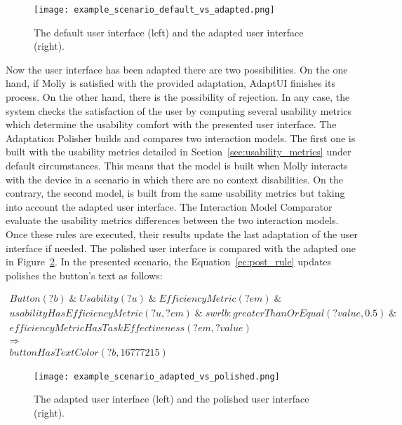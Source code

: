 \begin{figure}
\centering
\texttt{[image: example\_scenario\_default\_vs\_adapted.png]}
\caption{The default user interface (left) and the adapted user interface (right).}
\label{fig:example_scenario_default_vs_adapted}
\end{figure}


Now the user interface has been adapted there are two possibilities. On the one
hand, if Molly is satisfied with the provided adaptation, AdaptUI finishes its
process. On the other hand, there is the possibility of rejection. In any case,
the system checks the satisfaction of the user by computing several usability
metrics which determine the usability comfort with the presented user interface.
The Adaptation Polisher builds and compares two interaction models. The first 
one is built with the usability metrics detailed in 
Section~\ref{sec:usability_metrics} under default circumstances. This means that 
the model is built when Molly interacts with the device in a scenario in which
there are no context disabilities. On the contrary, the second model, is built 
from the same usability metrics but taking into account the adapted user interface. 
The Interaction Model Comparator evaluate the usability metrics differences
between the two interaction models. Once these rules are executed, their results 
update the last adaptation of the user interface if needed. The polished user 
interface is compared with the adapted one in 
Figure~\ref{fig:example_scenario_adapted_vs_polished}. In the presented scenario, 
the Equation~\ref{ec:post_rule} updates polishes the button's text as follows: 

\footnotesize
\begin{equation} \label{ec:post_rule} 
\begin{align*} 
Button(?b) \; \&\; Usability (?u) \; \&\; EfficiencyMetric(?em) \; \&\; \\
usabilityHasEfficiencyMetric(?u, ?em) \; \&\; swrlb:greaterThanOrEqual(?value, 0.5) \; \&\; \\
efficiencyMetricHasTaskEffectiveness(?em, ?value)\\
\Rightarrow \\
buttonHasTextColor(?b, 16777215)
\end{align*}
\end{equation}
\normalsize

\begin{figure}
\centering
\texttt{[image: example\_scenario\_adapted\_vs\_polished.png]}
\caption{The adapted user interface (left) and the polished user interface (right).}
\label{fig:example_scenario_adapted_vs_polished}
\end{figure}


